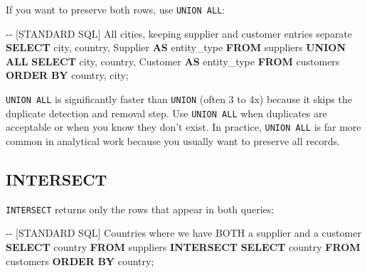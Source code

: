\documentclass[
  letterpaper,
  DIV=11,
  numbers=noendperiod]{scrreprt}
\newenvironment{Shaded}{\begin{snugshade}}{\end{snugshade}}
\newcommand{\CommentTok}[1]{\textcolor[rgb]{0.37,0.37,0.37}{#1}}
\newcommand{\KeywordTok}[1]{\textcolor[rgb]{0.00,0.23,0.31}{\textbf{#1}}}
\newcommand{\NormalTok}[1]{\textcolor[rgb]{0.00,0.23,0.31}{#1}}
\newcommand{\StringTok}[1]{\textcolor[rgb]{0.13,0.47,0.30}{#1}}
\begin{document}
If you want to preserve both rows, use \texttt{UNION\ ALL}:

\begin{codelisting}

\caption{\texttt{duckdb}}

\begin{Shaded}
\begin{Highlighting}[]
\CommentTok{{-}{-} [STANDARD SQL] All cities, keeping supplier and customer entries separate}
\KeywordTok{SELECT}\NormalTok{ city, country, }\StringTok{\textquotesingle{}Supplier\textquotesingle{}} \KeywordTok{AS}\NormalTok{ entity\_type}
\KeywordTok{FROM}\NormalTok{ suppliers}
\KeywordTok{UNION} \KeywordTok{ALL}
\KeywordTok{SELECT}\NormalTok{ city, country, }\StringTok{\textquotesingle{}Customer\textquotesingle{}} \KeywordTok{AS}\NormalTok{ entity\_type}
\KeywordTok{FROM}\NormalTok{ customers}
\KeywordTok{ORDER} \KeywordTok{BY}\NormalTok{ country, city;}
\end{Highlighting}
\end{Shaded}

\end{codelisting}

\texttt{UNION\ ALL} is significantly faster than \texttt{UNION} (often 3
to 4x) because it skips the duplicate detection and removal step. Use
\texttt{UNION\ ALL} when duplicates are acceptable or when you know they
don't exist. In practice, \texttt{UNION\ ALL} is far more common in
analytical work because you usually want to preserve all records.

\subsection{INTERSECT}\label{intersect}

\texttt{INTERSECT} returns only the rows that appear in both queries:

\begin{codelisting}

\caption{\texttt{duckdb}}

\begin{Shaded}
\begin{Highlighting}[]
\CommentTok{{-}{-} [STANDARD SQL] Countries where we have BOTH a supplier and a customer}
\KeywordTok{SELECT}\NormalTok{ country }\KeywordTok{FROM}\NormalTok{ suppliers}
\KeywordTok{INTERSECT}
\KeywordTok{SELECT}\NormalTok{ country }\KeywordTok{FROM}\NormalTok{ customers}
\KeywordTok{ORDER} \KeywordTok{BY}\NormalTok{ country;}
\end{Highlighting}
\end{Shaded}

\end{codelisting}
\end{document}
